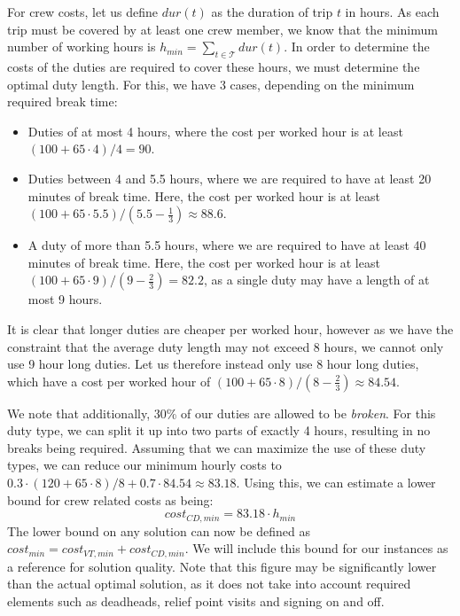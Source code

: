 \documentclass[]{article}
\begin{document}
\noindent For crew costs, let us define $dur(t)$ as the duration of trip $t$ in hours. As each trip must be covered by at least one crew member, we know that the minimum number of working hours is $h_{min} = \sum_{t \in \mathcal{T}} dur(t)$. In order to determine the costs of the duties are required to cover these hours, we must determine the optimal duty length. For this, we have 3 cases, depending on the minimum required break time: 
\begin{itemize}
  \item Duties of at most 4 hours, where the cost per worked hour is at least $(100 + 65 \cdot 4) / 4 = 90$.
  \item Duties between 4 and 5.5 hours, where we are required to have at least 20 minutes of break time. Here, the cost per worked hour is at least $(100 + 65 \cdot 5.5) / (5.5 - \frac{1}{3}) \approx 88.6$.
  \item A duty of more than 5.5 hours, where we are required to have at least 40 minutes of break time. Here, the cost per worked hour is at least $(100 + 65 \cdot 9) / (9 - \frac{2}{3}) = 82.2$, as a single duty may have a length of at most 9 hours.
\end{itemize}
It is clear that longer duties are cheaper per worked hour, however as we have the constraint that the average duty length may not exceed 8 hours, we cannot only use 9 hour long duties. Let us therefore instead only use 8 hour long duties, which have a cost per worked hour of $(100 + 65 \cdot 8) / (8 - \frac{2}{3}) \approx 84.54$. 

We note that additionally, 30\% of our duties are allowed to be \textit{broken}. For this duty type, we can split it up into two parts of exactly 4 hours, resulting in no breaks being required. Assuming that we can maximize the use of these duty types, we can reduce our minimum hourly costs to $0.3 \cdot (120 + 65 \cdot 8) / 8 + 0.7 \cdot 84.54 \approx 83.18$. Using this, we can estimate a lower bound for crew related costs as being:
\begin{equation}
  cost_{CD,min} = 83.18 \cdot h_{min} \nonumber
\end{equation}
The lower bound on any solution can now be defined as $cost_{min} = cost_{VT,min} + cost_{CD,min}$. We will include this bound for our instances as a reference for solution quality. Note that this figure may be significantly lower than the actual optimal solution, as it does not take into account required elements such as deadheads, relief point visits and signing on and off.
\end{document}
